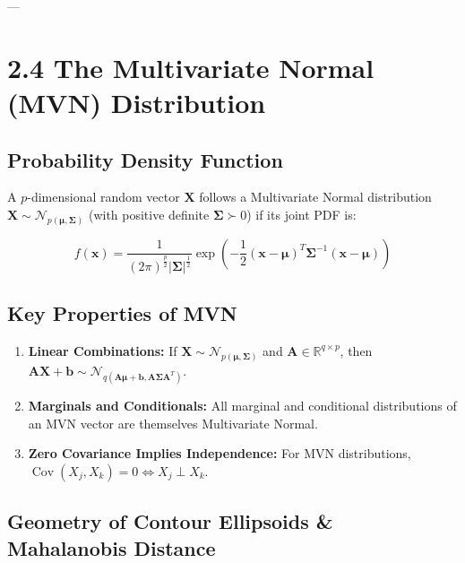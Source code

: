 \documentclass[
]{article}
\begin{document}
---

\textbf{ }

\section{2.4 The Multivariate Normal (MVN) Distribution}

\textbf{ }

\subsection{Probability Density Function}

A \(p\)-dimensional random vector \(\mathbf{X}\) follows a Multivariate
Normal distribution
\(\mathbf{X} \sim \mathcal{N}_{p\left( \mathbf{\mu},\mathbf{\Sigma} \right)}\)
(with positive definite \(\mathbf{\Sigma} \succ 0\)) if its joint PDF
is:

\[f\left( \mathbf{x} \right) = \frac{1}{(2\pi)^{\frac{p}{2}}|\mathbf{\Sigma}|^{\frac{1}{2}}}\exp( - \frac{1}{2}\left( \mathbf{x} - \mathbf{\mu} \right)^{T}\mathbf{\Sigma}^{- 1}\left( \mathbf{x} - \mathbf{\mu} \right))\]

\textbf{ }

\subsection{Key Properties of MVN}

\begin{enumerate}
\item
  \textbf{Linear Combinations:} If
  \(\mathbf{X} \sim \mathcal{N}_{p\left( \mathbf{\mu},\mathbf{\Sigma} \right)}\)
  and \(\mathbf{A} \in \mathbb{R}^{q \times p}\), then
  \(\mathbf{A}\mathbf{X} + \mathbf{b} \sim \mathcal{N}_{q\left( \mathbf{A}\mathbf{\mu} + \mathbf{b},\mathbf{A}\mathbf{\Sigma}\mathbf{A}^{T} \right)}\).
\item
  \textbf{Marginals and Conditionals:} All marginal and conditional
  distributions of an MVN vector are themselves Multivariate Normal.
\item
  \textbf{Zero Covariance Implies Independence:} For MVN distributions,
  \(\operatorname{Cov}(X_{j},X_{k}) = 0 \Longleftrightarrow X_{j} \perp X_{k}\).
\end{enumerate}

\textbf{ }

\subsection{Geometry of Contour Ellipsoids \& Mahalanobis Distance}
\end{document}
